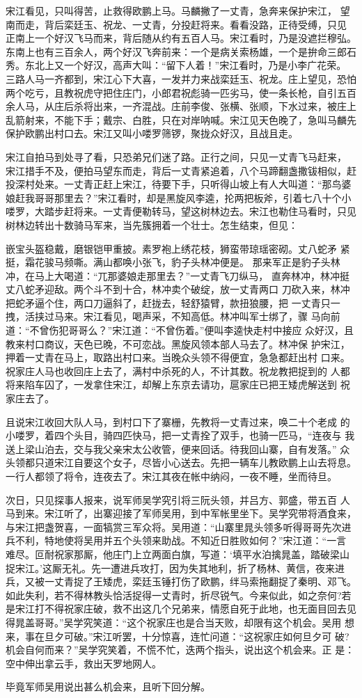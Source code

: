 宋江看见，只叫得苦，止救得欧鹏上马。马麟撇了一丈青，急奔来保护宋江，
望南而走，背后栾廷玉、祝龙、一丈青，分投赶将来。看看没路，正待受缚，只见
正南上一个好汉飞马而来，背后随从约有五百人马。宋江看时，乃是没遮拦穆弘。
东南上也有三百余人，两个好汉飞奔前来：一个是病关索杨雄，一个是拚命三郎石
秀。东北上又一个好汉，高声大叫：“留下人着！”宋江看时，乃是小李广花荣。
三路人马一齐都到，宋江心下大喜，一发并力来战栾廷玉、祝龙。庄上望见，恐怕
两个吃亏，且教祝虎守把住庄门，小郎君祝彪骑一匹劣马，使一条长枪，自引五百
余人马，从庄后杀将出来，一齐混战。庄前李俊、张横、张顺，下水过来，被庄上
乱箭射来，不能下手；戴宗、白胜，只在对岸呐喊。宋江见天色晚了，急叫马麟先
保护欧鹏出村口去。宋江又叫小喽罗筛锣，聚拢众好汉，且战且走。

宋江自拍马到处寻了看，只恐弟兄们迷了路。正行之间，只见一丈青飞马赶来，
宋江措手不及，便拍马望东而走，背后一丈青紧追着，八个马蹄翻盏撒钹相似，赶
投深村处来。一丈青正赶上宋江，待要下手，只听得山坡上有人大叫道：“那鸟婆
娘赶我哥哥那里去？”宋江看时，却是黑旋风李逵，抡两把板斧，引着七八十个小
喽罗，大踏步赶将来。一丈青便勒转马，望这树林边去。宋江也勒住马看时，只见
树林边转出十数骑马军来，当先簇拥着一个壮士。怎生结束，但见：

嵌宝头盔稳戴，磨银铠甲重披。素罗袍上绣花枝，狮蛮带琼瑶密砌。丈八蛇矛
紧挺，霜花骏马频嘶。满山都唤小张飞，豹子头林冲便是。
那来军正是豹子头林冲，在马上大喝道：“兀那婆娘走那里去？”一丈青飞刀纵马，
直奔林冲，林冲挺丈八蛇矛迎敌。两个斗不到十合，林冲卖个破绽，放一丈青两口
刀砍入来，林冲把蛇矛逼个住，两口刀逼斜了，赶拢去，轻舒猿臂，款扭狼腰，把
一丈青只一拽，活挟过马来。宋江看见，喝声采，不知高低。林冲叫军士绑了，骤
马向前道：“不曾伤犯哥哥么？”宋江道：“不曾伤着。”便叫李逵快走村中接应
众好汉，且教来村口商议，天色已晚，不可恋战。黑旋风领本部人马去了。林冲保
护宋江，押着一丈青在马上，取路出村口来。当晚众头领不得便宜，急急都赶出村
口来。祝家庄人马也收回庄上去了，满村中杀死的人，不计其数。祝龙教把捉到的
人都将来陷车囚了，一发拿住宋江，却解上东京去请功，扈家庄已把王矮虎解送到
祝家庄去了。

且说宋江收回大队人马，到村口下了寨栅，先教将一丈青过来，唤二十个老成
的小喽罗，着四个头目，骑四匹快马，把一丈青拴了双手，也骑一匹马，“连夜与
我送上梁山泊去，交与我父亲宋太公收管，便来回话。待我回山寨，自有发落。”
众头领都只道宋江自要这个女子，尽皆小心送去。先把一辆车儿教欧鹏上山去将息。
一行人都领了将令，连夜去了。宋江其夜在帐中纳闷，一夜不睡，坐而待旦。

次日，只见探事人报来，说军师吴学究引将三阮头领，并吕方、郭盛，带五百
人马到来。宋江听了，出寨迎接了军师吴用，到中军帐里坐下。吴学究带将酒食来，
与宋江把盏贺喜，一面犒赏三军众将。吴用道：“山寨里晁头领多听得哥哥先次进
兵不利，特地使将吴用并五个头领来助战。不知近日胜败如何？”宋江道：“一言
难尽。叵耐祝家那厮，他庄门上立两面白旗，写道：‘填平水泊擒晁盖，踏破梁山
捉宋江。’这厮无礼。先一遭进兵攻打，因为失其地利，折了杨林、黄信，夜来进
兵，又被一丈青捉了王矮虎，栾廷玉锤打伤了欧鹏，绊马索拖翻捉了秦明、邓飞。
如此失利，若不得林教头恰活捉得一丈青时，折尽锐气。今来似此，如之奈何?若
是宋江打不得祝家庄破，救不出这几个兄弟来，情愿自死于此地，也无面目回去见
得晁盖哥哥。”吴学究笑道：“这个祝家庄也是合当天败，却限有这个机会。吴用
想来，事在旦夕可破。”宋江听罢，十分惊喜，连忙问道：“这祝家庄如何旦夕可
破?机会自何而来？”吴学究笑着，不慌不忙，迭两个指头，说出这个机会来。正
是：空中伸出拿云手，救出天罗地网人。

毕竟军师吴用说出甚么机会来，且听下回分解。